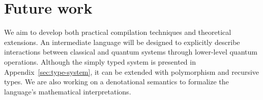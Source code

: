 \section{Future work}
We aim to develop both practical compilation techniques and theoretical extensions.
An intermediate language will be designed to explicitly describe interactions between classical and quantum systems through lower-level quantum operations.
Although the simply typed system is presented in Appendix~\ref{sec:type-system}, it can be extended with polymorphism and recursive types.
We are also working on a denotational semantics to formalize the language's mathematical interpretations.
